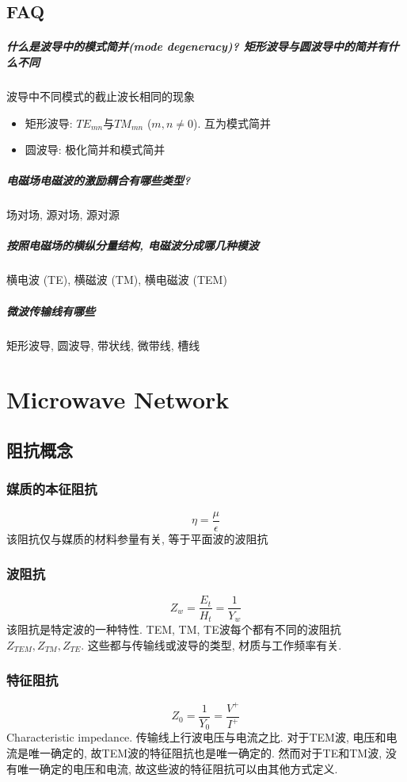 \documentclass[a4paper]{report}
\begin{document}
\section{FAQ}
\paragraph{什么是波导中的模式简并(mode degeneracy)? 矩形波导与圆波导中的简并有什么不同}
波导中不同模式的截止波长相同的现象
\begin{itemize}
  \item 矩形波导: $TE_{mn}$与$TM_{mn}$ ($m,n\neq 0$). 互为模式简并
  \item 圆波导: 极化简并和模式简并
\end{itemize}

\paragraph{电磁场电磁波的激励耦合有哪些类型? }场对场, 源对场, 源对源
\paragraph{按照电磁场的横纵分量结构, 电磁波分成哪几种模波}横电波 (TE), 横磁波 (TM), 横电磁波 (TEM)
\paragraph{微波传输线有哪些}矩形波导, 圆波导, 带状线, 微带线, 槽线

\chapter{Microwave Network}
\section{阻抗概念}
\subsection{媒质的本征阻抗}
$$\eta=\frac{\mu}{\epsilon}$$该阻抗仅与媒质的材料参量有关, 等于平面波的波阻抗
\subsection{波阻抗}
$$Z_w=\frac{E_t}{H_t}=\frac{1}{Y_w}$$该阻抗是特定波的一种特性. TEM, TM, TE波每个都有不同的波阻抗$Z_{TEM},Z_{TM},Z_{TE}$. 这些都与传输线或波导的类型, 材质与工作频率有关. 
\subsection{特征阻抗}
$$Z_0=\frac{1}{Y_0}=\frac{V^+}{I^+}$$ Characteristic impedance. 传输线上行波电压与电流之比. 对于TEM波, 电压和电流是唯一确定的, 故TEM波的特征阻抗也是唯一确定的. 然而对于TE和TM波, 没有唯一确定的电压和电流, 故这些波的特征阻抗可以由其他方式定义. 
\end{document}
